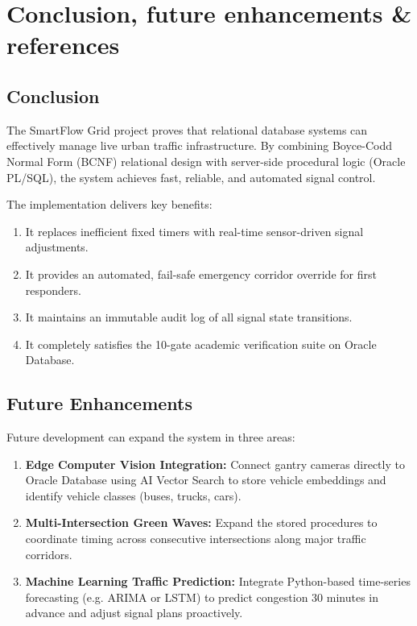 \documentclass[11pt,a4paper]{article}
\begin{document}
\section{Conclusion, future enhancements \& references}

\subsection{Conclusion}
The SmartFlow Grid project proves that relational database systems can effectively manage live urban traffic infrastructure. By combining Boyce-Codd Normal Form (BCNF) relational design with server-side procedural logic (Oracle PL/SQL), the system achieves fast, reliable, and automated signal control. 

The implementation delivers key benefits:
\begin{enumerate}
    \item It replaces inefficient fixed timers with real-time sensor-driven signal adjustments.
    \item It provides an automated, fail-safe emergency corridor override for first responders.
    \item It maintains an immutable audit log of all signal state transitions.
    \item It completely satisfies the 10-gate academic verification suite on Oracle Database.
\end{enumerate}

\subsection{Future Enhancements}
Future development can expand the system in three areas:
\begin{enumerate}
    \item \textbf{Edge Computer Vision Integration:} Connect gantry cameras directly to Oracle Database using AI Vector Search to store vehicle embeddings and identify vehicle classes (buses, trucks, cars).
    \item \textbf{Multi-Intersection Green Waves:} Expand the stored procedures to coordinate timing across consecutive intersections along major traffic corridors.
    \item \textbf{Machine Learning Traffic Prediction:} Integrate Python-based time-series forecasting (e.g. ARIMA or LSTM) to predict congestion 30 minutes in advance and adjust signal plans proactively.
\end{enumerate}
\end{document}
